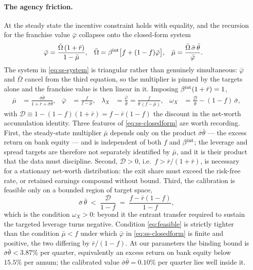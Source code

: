 \paragraph{The agency friction.}
At the steady state the incentive constraint holds with equality, and the
recursion for the franchise value $\bar\varphi$ collapses onto the closed-form
system
\begin{align}
\bar\varphi&=\frac{\bar\Omega\,(1+\bar r)}{1-\bar\mu},
&
\bar\Omega&=\beta^{\rm int}\bigl[f+(1-f)\bar\varphi\bigr],
&
\bar\mu&=\frac{\bar\Omega\,\bar\sigma\,\bar\theta}{\bar\varphi}.
\label{eq:ss-system}
\end{align}
The system in \eqref{eq:ss-system} is triangular rather than genuinely
simultaneous: $\bar\varphi$ and $\bar\Omega$ cancel from the third equation, so
the multiplier is pinned by the targets alone and the franchise value is then
linear in it. Imposing $\beta^{\rm int}(1+\bar r)=1$,
\begin{align}
\bar\mu&=\frac{\bar\sigma\bar\theta}{1+\bar r+\bar\sigma\bar\theta},
&
\bar\varphi&=\frac{f}{f-\bar\mu},
&
\lambda_X&=\frac{\bar\varphi}{\bar\theta}=\frac{f}{\bar\theta\,(f-\bar\mu)},
&
\omega_X&=\frac{\mathcal{D}}{\bar\theta}-(1-f)\,\bar\sigma,
\label{eq:ss-closedform}
\end{align}
with $\mathcal{D}\equiv1-(1-f)(1+\bar r)=f-\bar r(1-f)$ the discount in the
net-worth accumulation identity. Three features of \eqref{eq:ss-closedform} are
worth recording. First, the steady-state multiplier $\bar\mu$ depends only on the
product $\bar\sigma\bar\theta$ --- the excess return on bank equity --- and is
independent of both $f$ and $\beta^{\rm int}$; the leverage and spread targets
are therefore not separately identified by $\bar\mu$, and it is their product
that the data must discipline. Second, $\mathcal{D}>0$, i.e.\ $f>\bar
r/(1+\bar r)$, is necessary for a stationary net-worth distribution: the exit
share must exceed the risk-free rate, or retained earnings compound without
bound. Third, the calibration is feasible only on a bounded region of target
space,
\begin{equation}
\bar\sigma\,\bar\theta\;<\;\frac{\mathcal{D}}{1-f}
\;=\;\frac{f-\bar r(1-f)}{1-f},
\label{eq:feasible}
\end{equation}
which is the condition $\omega_X>0$: beyond it the entrant transfer required to
sustain the targeted leverage turns negative. Condition \eqref{eq:feasible} is
strictly tighter than the condition $\bar\mu<f$ under which $\bar\varphi$ in
\eqref{eq:ss-closedform} is finite and positive, the two differing by
$\bar r/(1-f)$. At our parameters the binding bound is $\bar\sigma\bar\theta<
3.87\%$ per quarter, equivalently an excess return on bank equity below
$15.5\%$ per annum; the calibrated value $\bar\sigma\bar\theta=0.10\%$ per
quarter lies well inside it.

